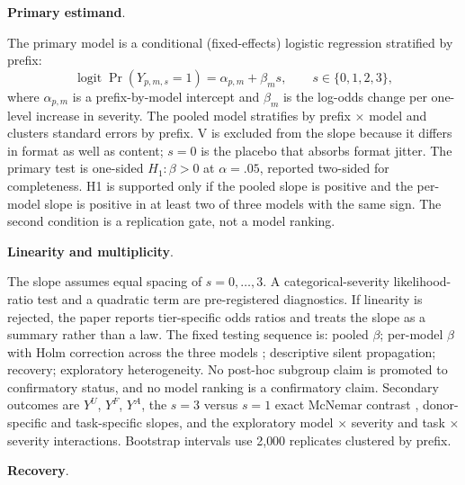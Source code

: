 \documentclass[a4paper,fleqn]{cas-sc}
\begin{document}
\noindent\textbf{Primary estimand}.\

The primary model is a conditional (fixed-effects) logistic regression stratified by prefix:
\begin{equation}
  \operatorname{logit}\Pr(Y_{p,m,s}=1) = \alpha_{p,m} + \beta_m s,
  \qquad s \in \{0,1,2,3\},
  \label{eq:primary}
\end{equation}
where $\alpha_{p,m}$ is a prefix-by-model intercept and $\beta_m$ is the log-odds change per
one-level increase in severity. The pooled model stratifies by prefix $\times$ model and clusters
standard errors by prefix. V is excluded from the slope because it differs in format as well as
content; $s=0$ is the placebo that absorbs format jitter. The primary test is one-sided
$H_1:\beta>0$ at $\alpha=.05$, reported two-sided for completeness. H1 is supported only if the
pooled slope is positive and the per-model slope is positive in at least two of three models with
the same sign. The second condition is a replication gate, not a model ranking.

\noindent\textbf{Linearity and multiplicity}.\

The slope assumes equal spacing of $s=0,\dots,3$. A categorical-severity likelihood-ratio test
and a quadratic term are pre-registered diagnostics. If linearity is rejected, the paper reports
tier-specific odds ratios and treats the slope as a summary rather than a law. The fixed testing
sequence is: pooled $\beta$; per-model $\beta$ with Holm correction across the three models
\cite{holm1979}; descriptive silent propagation; recovery; exploratory heterogeneity. No
post-hoc subgroup claim is promoted to confirmatory status, and no model ranking is a
confirmatory claim. Secondary outcomes are $Y^{U}$, $Y^{F}$, $Y^{A}$, the $s=3$ versus $s=1$
exact McNemar contrast \cite{mcnemar1947}, donor-specific and task-specific slopes, and the
exploratory model $\times$ severity and task $\times$ severity interactions. Bootstrap intervals
use 2{,}000 replicates clustered by prefix.

\noindent\textbf{Recovery}.\
\end{document}
